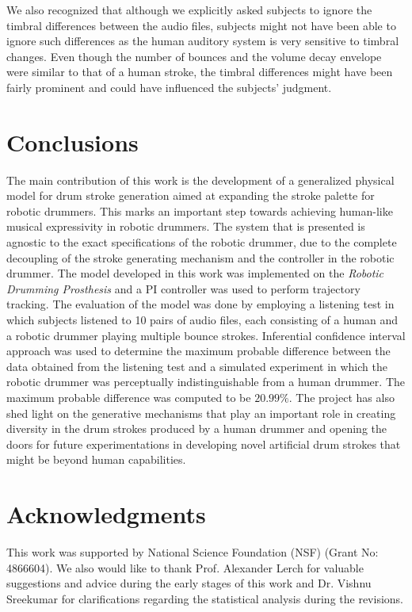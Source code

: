 \documentclass[final,1p,times]{elsarticle}
\begin{document}
We also recognized
that although we explicitly asked subjects to ignore the timbral differences
between the audio files, subjects might not have been able to ignore such
differences as the human auditory system is very sensitive to timbral changes.
Even though the number of bounces and the volume decay envelope were
similar to that of a human stroke, the timbral differences might have been
fairly prominent and could have influenced the subjects' judgment.

\section{Conclusions}
The main contribution of this work is the development of a generalized physical model for drum stroke generation aimed at expanding the stroke palette for robotic drummers. This marks an important step towards achieving human-like musical expressivity in robotic drummers. The system that is presented is agnostic to the exact specifications of the robotic drummer, due to the complete decoupling of the stroke generating mechanism and the controller in the robotic drummer. 
The model developed in this work was implemented on the \textit{Robotic Drumming Prosthesis} and a PI controller was used to perform trajectory tracking. The evaluation of the model was done by employing a listening test in which subjects listened to 10 pairs of audio files, each consisting of a human and a robotic drummer playing multiple bounce strokes. Inferential confidence interval approach was used to determine the maximum probable difference between the data obtained from the listening test and a simulated experiment in which the robotic drummer was perceptually indistinguishable from a human drummer. The maximum probable difference was computed to be $20.99\%$. The project has also shed light on the generative mechanisms that play an important role in creating diversity in the drum strokes produced by a human drummer and opening the doors for future experimentations in developing novel artificial drum strokes that might be beyond human capabilities.
\section*{Acknowledgments}
This work was supported by National Science Foundation (NSF) (Grant No: 4866604). We also would like to thank Prof. Alexander Lerch for valuable suggestions and advice during the early stages of this work and Dr. Vishnu Sreekumar for clarifications regarding the statistical analysis during the revisions. 
\end{document}

